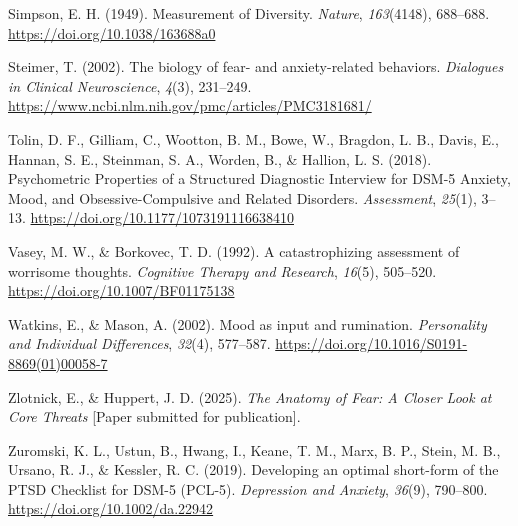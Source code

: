 \documentclass[
  man,floatsintext]{apa7}
\newlength{\cslhangindent}
\newlength{\cslentryspacingunit} %
\newenvironment{CSLReferences}[2] %
 {%
  \setlength{\parindent}{0pt}
  \ifodd #1
  \let\oldpar\par
  \def\par{\hangindent=\cslhangindent\oldpar}
  \fi
  \setlength{\parskip}{#2\cslentryspacingunit}
 }%
 {}
\begin{document}
\begin{CSLReferences}{1}{0}
\leavevmode{}%
Simpson, E. H. (1949). Measurement of Diversity. \emph{Nature}, \emph{163}(4148), 688--688. \url{https://doi.org/10.1038/163688a0}

\leavevmode{}%
Steimer, T. (2002). The biology of fear- and anxiety-related behaviors. \emph{Dialogues in Clinical Neuroscience}, \emph{4}(3), 231--249. \url{https://www.ncbi.nlm.nih.gov/pmc/articles/PMC3181681/}

\leavevmode{}%
Tolin, D. F., Gilliam, C., Wootton, B. M., Bowe, W., Bragdon, L. B., Davis, E., Hannan, S. E., Steinman, S. A., Worden, B., \& Hallion, L. S. (2018). Psychometric Properties of a Structured Diagnostic Interview for DSM-5 Anxiety, Mood, and Obsessive-Compulsive and Related Disorders. \emph{Assessment}, \emph{25}(1), 3--13. \url{https://doi.org/10.1177/1073191116638410}

\leavevmode{}%
Vasey, M. W., \& Borkovec, T. D. (1992). A catastrophizing assessment of worrisome thoughts. \emph{Cognitive Therapy and Research}, \emph{16}(5), 505--520. \url{https://doi.org/10.1007/BF01175138}

\leavevmode{}%
Watkins, E., \& Mason, A. (2002). Mood as input and rumination. \emph{Personality and Individual Differences}, \emph{32}(4), 577--587. \url{https://doi.org/10.1016/S0191-8869(01)00058-7}

\leavevmode{}%
Zlotnick, E., \& Huppert, J. D. (2025). \emph{The Anatomy of Fear: A Closer Look at Core Threats} {[}Paper submitted for publication{]}.

\leavevmode{}%
Zuromski, K. L., Ustun, B., Hwang, I., Keane, T. M., Marx, B. P., Stein, M. B., Ursano, R. J., \& Kessler, R. C. (2019). Developing an optimal short-form of the PTSD Checklist for DSM-5 (PCL-5). \emph{Depression and Anxiety}, \emph{36}(9), 790--800. \url{https://doi.org/10.1002/da.22942}

\end{CSLReferences}
\end{document}
